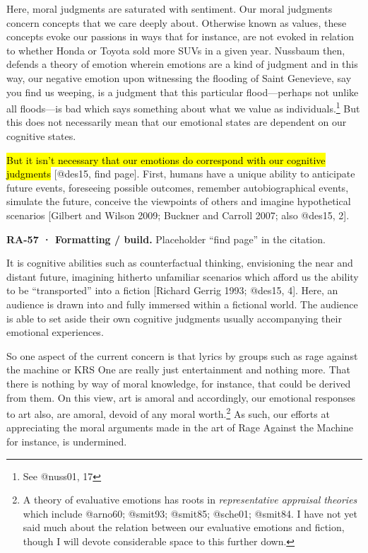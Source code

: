 \documentclass[
  letterpaper,
  DIV=11,
  numbers=noendperiod]{scrartcl}
\theoremstyle{remark}
\begin{document}
Here, moral judgments are saturated with sentiment. Our moral judgments
concern concepts that we care deeply about. Otherwise known as values,
these concepts evoke our passions in ways that for instance, are not
evoked in relation to whether Honda or Toyota sold more SUVs in a given
year. Nussbaum then, defends a theory of emotion wherein emotions are a
kind of judgment and in this way, our negative emotion upon witnessing
the flooding of Saint Genevieve, say you find us weeping, is a judgment
that this particular flood---perhaps not unlike all floods---is bad
which says something about what we value as individuals.\footnote{See
  @nuss01, 17} But this does not necessarily mean that our emotional
states are dependent on our cognitive states.

\hl{But it isn't necessary that our emotions do correspond with our
cognitive judgments} {[}@des15, find page{]}. First, humans have a
unique ability to anticipate future events, foreseeing possible
outcomes, remember autobiographical events, simulate the future,
conceive the viewpoints of others and imagine hypothetical scenarios
{[}Gilbert and Wilson 2009; Buckner and Carroll 2007; also @des15, 2{]}.

\begin{tcolorbox}[enhanced jigsaw, arc=.35mm, bottomrule=.15mm, bottomtitle=1mm, breakable, colback=white, colbacktitle=quarto-callout-note-color!10!white, colframe=quarto-callout-note-color-frame, coltitle=black, left=2mm, leftrule=.75mm, opacityback=0, opacitybacktitle=0.6, rightrule=.15mm, title=\textcolor{quarto-callout-note-color}{\faInfo}\hspace{0.5em}{Note}, titlerule=0mm, toprule=.15mm, toptitle=1mm]

\textbf{RA-57 · Formatting / build.} Placeholder ``find page'' in the
citation.

\end{tcolorbox}

It is cognitive abilities such as counterfactual thinking, envisioning
the near and distant future, imagining hitherto unfamiliar scenarios
which afford us the ability to be ``transported'' into a fiction
{[}Richard Gerrig 1993; @des15, 4{]}. Here, an audience is drawn into
and fully immersed within a fictional world. The audience is able to set
aside their own cognitive judgments usually accompanying their emotional
experiences.

So one aspect of the current concern is that lyrics by groups such as
rage against the machine or KRS One are really just entertainment and
nothing more. That there is nothing by way of moral knowledge, for
instance, that could be derived from them. On this view, art is amoral
and accordingly, our emotional responses to art also, are amoral, devoid
of any moral worth.\footnote{A theory of evaluative emotions has roots
  in \emph{representative appraisal theories} which include @arno60;
  @smit93; @smit85; @sche01; @smit84. I have not yet said much about the
  relation between our evaluative emotions and fiction, though I will
  devote considerable space to this further down.} As such, our efforts
at appreciating the moral arguments made in the art of Rage Against the
Machine for instance, is undermined.
\end{document}
